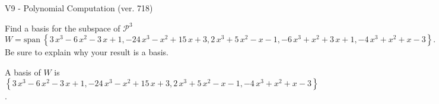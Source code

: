 \begin{exercise}
  \begin{exerciseTitle}V9 - Polynomial Computation (ver. 718)\end{exerciseTitle}
  \begin{exerciseStatement}
    Find a basis for the subspace of \(\mathcal{P}^3\) 
\[W=\mathrm{span}\ \left\{3 \, x^{3} - 6 \, x^{2} - 3 \, x + 1 , -24 \, x^{3} - x^{2} + 15 \, x + 3 , 2 \, x^{3} + 5 \, x^{2} - x - 1 , -6 \, x^{3} + x^{2} + 3 \, x + 1 , -4 \, x^{3} + x^{2} + x - 3\right\}.\]
 Be sure to explain why your result is a basis.


  \end{exerciseStatement}
  \begin{exerciseAnswer}
   A basis of \(W\) is  \(\left\{3 \, x^{3} - 6 \, x^{2} - 3 \, x + 1 , -24 \, x^{3} - x^{2} + 15 \, x + 3 , 2 \, x^{3} + 5 \, x^{2} - x - 1 , -4 \, x^{3} + x^{2} + x - 3\right\}\).
  


  \end{exerciseAnswer}
\end{exercise}